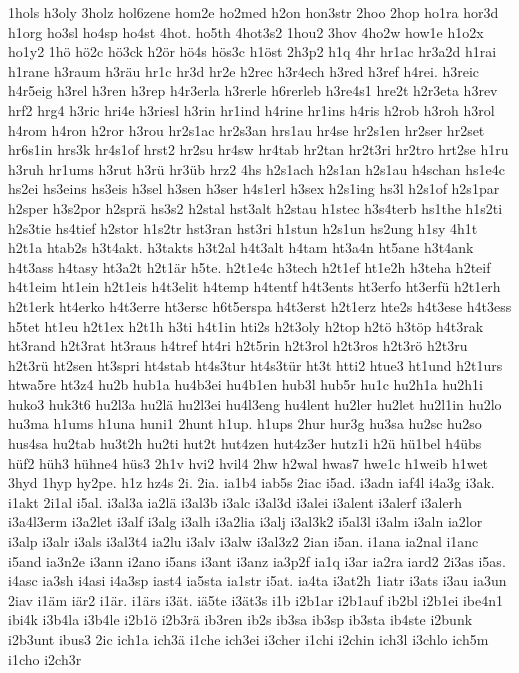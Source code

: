 {1hols
h3oly
3holz
hol6zene
hom2e
ho2med
h2on
hon3str
2hoo
2hop
ho1ra
hor3d
h1org
ho3sl
ho4sp
ho4st
4hot.
ho5th
4hot3s2
1hou2
3hov
4ho2w
how1e
h1o2x
ho1y2
1hö
hö2c
hö3ck
h2ör
hö4s
hös3c
h1öst
2h3p2
h1q
4hr
hr1ac
hr3a2d
h1rai
h1rane
h3raum
h3räu
hr1c
hr3d
hr2e
h2rec
h3r4ech
h3red
h3ref
h4rei.
h3reic
h4r5eig
h3rel
h3ren
h3rep
h4r3erla
h3rerle
h6rerleb
h3re4s1
hre2t
h2r3eta
h3rev
hrf2
hrg4
h3ric
hri4e
h3riesl
h3rin
hr1ind
h4rine
hr1ins
h4ris
h2rob
h3roh
h3rol
h4rom
h4ron
h2ror
h3rou
hr2s1ac
hr2s3an
hrs1au
hr4se
hr2s1en
hr2ser
hr2set
hr6s1in
hrs3k
hr4s1of
hrst2
hr2su
hr4sw
hr4tab
hr2tan
hr2t3ri
hr2tro
hrt2se
h1ru
h3ruh
hr1ums
h3rut
h3rü
hr3üb
hrz2
4hs
h2s1ach
h2s1an
h2s1au
h4schan
hs1e4c
hs2ei
hs3eins
hs3eis
h3sel
h3sen
h3ser
h4s1erl
h3sex
h2s1ing
hs3l
h2s1of
h2s1par
h2sper
h3s2por
h2sprä
hs3s2
h2stal
hst3alt
h2stau
h1stec
h3s4terb
hs1the
h1s2ti
h2s3tie
hs4tief
h2stor
h1s2tr
hst3ran
hst3ri
h1stun
h2s1un
hs2ung
h1sy
4h1t
h2t1a
htab2s
h3t4akt.
h3takts
h3t2al
h4t3alt
h4tam
ht3a4n
ht5ane
h3t4ank
h4t3ass
h4tasy
ht3a2t
h2t1är
h5te.
h2t1e4c
h3tech
h2t1ef
ht1e2h
h3teha
h2teif
h4t1eim
ht1ein
h2t1eis
h4t3elit
h4temp
h4tentf
h4t3ents
ht3erfo
ht3erfü
h2t1erh
h2t1erk
ht4erko
h4t3erre
ht3ersc
h6t5erspa
h4t3erst
h2t1erz
hte2s
h4t3ese
h4t3ess
h5tet
ht1eu
h2t1ex
h2t1h
h3ti
h4t1in
hti2s
h2t3oly
h2top
h2tö
h3töp
h4t3rak
ht3rand
h2t3rat
ht3raus
h4tref
ht4ri
h2t5rin
h2t3rol
h2t3ros
h2t3rö
h2t3ru
h2t3rü
ht2sen
ht3spri
ht4stab
ht4s3tur
ht4s3tür
ht3t
htti2
htue3
ht1und
h2t1urs
htwa5re
ht3z4
hu2b
hub1a
hu4b3ei
hu4b1en
hub3l
hub5r
hu1c
hu2h1a
hu2h1i
huko3
huk3t6
hu2l3a
hu2lä
hu2l3ei
hu4l3eng
hu4lent
hu2ler
hu2let
hu2l1in
hu2lo
hu3ma
h1ums
h1una
huni1
2hunt
h1up.
h1ups
2hur
hur3g
hu3sa
hu2sc
hu2so
hus4sa
hu2tab
hu3t2h
hu2ti
hut2t
hut4zen
hut4z3er
hutz1i
h2ü
hü1bel
h4übs
hüf2
hüh3
hühne4
hüs3
2h1v
hvi2
hvil4
2hw
h2wal
hwas7
hwe1c
h1weib
h1wet
3hyd
1hyp
hy2pe.
h1z
hz4s
2i.
2ia.
ia1b4
iab5s
2iac
i5ad.
i3adn
iaf4l
i4a3g
i3ak.
i1akt
2i1al
i5al.
i3al3a
ia2lä
i3al3b
i3alc
i3al3d
i3alei
i3alent
i3alerf
i3alerh
i3a4l3erm
i3a2let
i3alf
i3alg
i3alh
i3a2lia
i3alj
i3al3k2
i5al3l
i3alm
i3aln
ia2lor
i3alp
i3alr
i3als
i3al3t4
ia2lu
i3alv
i3alw
i3al3z2
2ian
i5an.
i1ana
ia2nal
i1anc
i5and
ia3n2e
i3ann
i2ano
i5ans
i3ant
i3anz
ia3p2f
ia1q
i3ar
ia2ra
iard2
2i3as
i5as.
i4asc
ia3sh
i4asi
i4a3sp
iast4
ia5sta
ia1str
i5at.
ia4ta
i3at2h
1iatr
i3ats
i3au
ia3un
2iav
i1äm
iär2
i1är.
i1ärs
i3ät.
iä5te
i3ät3s
i1b
i2b1ar
i2b1auf
ib2bl
i2b1ei
ibe4n1
ibi4k
i3b4la
i3b4le
i2b1ö
i2b3rä
ib3ren
ib2s
ib3sa
ib3sp
ib3sta
ib4ste
i2bunk
i2b3unt
ibus3
2ic
ich1a
ich3ä
i1che
ich3ei
i3cher
i1chi
i2chin
ich3l
i3chlo
ich5m
i1cho
i2ch3r
}
